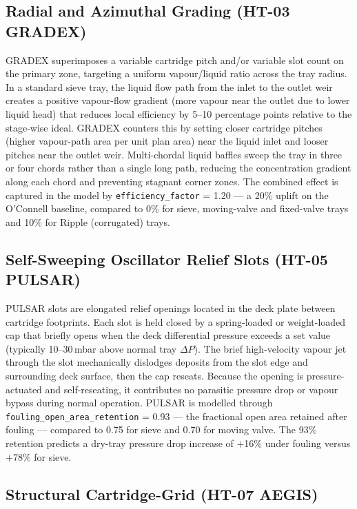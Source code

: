 \documentclass[11pt,letterpaper]{article}
\begin{document}
\subsection{Radial and Azimuthal Grading (HT-03 GRADEX)}
\label{sec:gradex}

GRADEX superimposes a variable cartridge pitch and/or variable slot count on
the primary zone, targeting a uniform vapour/liquid ratio across the tray
radius.  In a standard sieve tray, the liquid flow path from the inlet to the
outlet weir creates a positive vapour-flow gradient (more vapour near the
outlet due to lower liquid head) that reduces local efficiency by 5--10
percentage points relative to the stage-wise ideal.  GRADEX counters this by
setting closer cartridge pitches (higher vapour-path area per unit plan area)
near the liquid inlet and looser pitches near the outlet weir.  Multi-chordal
liquid baffles sweep the tray in three or four chords rather than a single
long path, reducing the concentration gradient along each chord and preventing
stagnant corner zones.  The combined effect is captured in the model by
\texttt{efficiency\_factor} = 1.20 --- a 20\% uplift on the O'Connell
baseline, compared to 0\% for sieve, moving-valve and fixed-valve trays and
10\% for Ripple (corrugated) trays.

\subsection{Self-Sweeping Oscillator Relief Slots (HT-05 PULSAR)}
\label{sec:pulsar}

PULSAR slots are elongated relief openings located in the deck plate between
cartridge footprints.  Each slot is held closed by a spring-loaded or
weight-loaded cap that briefly opens when the deck differential pressure
exceeds a set value (typically 10--30\,mbar above normal tray $\Delta P$).
The brief high-velocity vapour jet through the slot mechanically dislodges
deposits from the slot edge and surrounding deck surface, then the cap
reseats.  Because the opening is pressure-actuated and self-reseating, it
contributes no parasitic pressure drop or vapour bypass during normal
operation.  PULSAR is modelled through \texttt{fouling\_open\_area\_retention}
= 0.93 --- the fractional open area retained after fouling --- compared to
0.75 for sieve and 0.70 for moving valve.  The 93\% retention predicts a dry-tray
pressure drop increase of $+$16\% under fouling versus $+$78\% for sieve.

\subsection{Structural Cartridge-Grid (HT-07 AEGIS)}
\label{sec:aegis}
\end{document}

